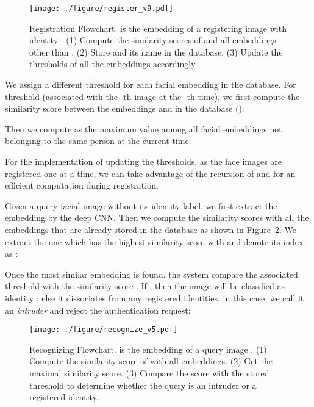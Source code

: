 \documentclass[10pt,twocolumn]{article}
\begin{document}
\begin{figure}[t]
\centering
\texttt{[image: ./figure/register\_v9.pdf]}
\caption{Registration Flowchart.  is the embedding of a registering image with identity . (1) Compute the similarity scores of  and all embeddings other than . (2) Store  and its name in the database. (3) Update the thresholds of all the embeddings accordingly.}
\label{fig:register}
\end{figure}

We assign a different threshold for each facial embedding in the database. For threshold  (associated with the -th image at the -th time), we first compute the similarity score between the embeddings  and  in the database ():

Then we compute  as the maximum value among all facial embeddings not belonging to the same person at the current time:

For the implementation of updating the thresholds, as the face images are registered one at a time, we can take advantage of the recursion of  and  for an efficient computation during registration.









Given a query facial image  without its identity label, we first extract the embedding  by the deep CNN. Then we compute the similarity scores with all the embeddings that are already stored in the database as shown in Figure~\ref{fig:recognition}. We extract the one which has the highest similarity score with  and denote its index as :


Once the most similar embedding  is found, the system compare the associated threshold  with the similarity score . If , then the image  will be classified as identity ; else it dissociates from any registered identities, in this case, we call it an \textit{intruder} and reject the authentication request:


\begin{figure}[t]
\centering
\texttt{[image: ./figure/recognize\_v5.pdf]}
\caption{Recognizing Flowchart.  is the embedding of a query image . (1) Compute the similarity score of  with all embeddings. (2) Get the maximal similarity score. (3) Compare the score with the stored threshold to determine whether the query is an intruder or a registered identity.}
\label{fig:recognition}
\end{figure}
\end{document}
